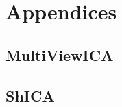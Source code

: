 \documentclass[ twoside,openright,titlepage,numbers=noenddot,%
                headinclude,footinclude,cleardoublepage=empty,abstract=on,
                BCOR=5mm,paper=a4,fontsize=11pt, 
                ]{scrreprt}
\begin{document}


  



% 

\cleardoublepage

\appendix
\part{Appendices}
\chapter{MultiViewICA}

\chapter{ShICA}


\end{document}

